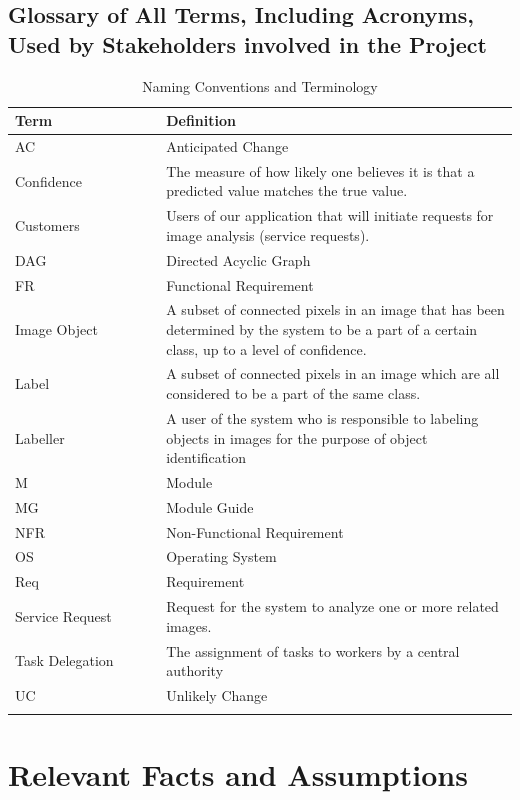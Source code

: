 \documentclass[12pt]{article}
\begin{document}
\subsection{Glossary of All Terms, Including Acronyms, Used by Stakeholders
involved in the Project}
\begin{longtable}{|p{0.3\linewidth} | p{0.7\linewidth}| }

    \hline
    \textbf{Term} & \textbf{Definition}\\
    \hline
    AC & Anticipated Change\\
    \hline
    Confidence & The measure of how likely one believes it is that a predicted value matches the true value.\\
    \hline
    Customers & Users of our application that will initiate requests for image analysis (service requests).\\
    \hline
    DAG & Directed Acyclic Graph \\
    \hline
    FR & Functional Requirement \\
    \hline
    Image Object & A subset of connected pixels in an image that has been determined by the system to be a part of a certain class, up to a level of confidence.\\
    \hline
    Label & A subset of connected pixels in an image which are all considered to be a part of the same class.\\
    \hline
    Labeller & A user of the system who is responsible to labeling objects in images for the purpose of object identification\\
    \hline
    M & Module \\
    \hline
    MG & Module Guide \\
    \hline
    NFR & Non-Functional Requirement \\
    \hline
    OS & Operating System \\
    \hline
    Req & Requirement\\
    \hline
    Service Request & Request for the system to analyze one or more related images.\\
    \hline
    Task Delegation & The assignment of tasks to workers by a central authority\\
    \hline
    UC & Unlikely Change \\
    \hline
    \caption{Naming Conventions and Terminology}
\end{longtable}
\newpage
\section{Relevant Facts and Assumptions}
\end{document}
